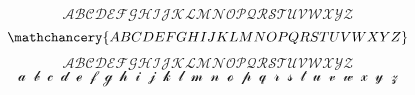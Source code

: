 \documentclass{article}
\begin{document}
$$\mathcal{ABCDEFGHIJKLMNOPQRSTUVWXYZ}$$
$$\mathchancery{ABCDEFGHIJKLMNOPQRSTUVWXYZ}$$
$$\mathscr{ABCDEFGHIJKLMNOPQRSTUVWXYZ}$$
$$
\mscra\mscrb\mscrc\mscrd\mscre\mscrf\mscrg\mscrh\mscri\mscrj
\mscrk\mscrl\mscrm\mscrn\mscro\mscrp\mscrq\mscrr\mscrs\mscrt
\mscru\mscrv\mscrw\mscrx\mscry\mscrz
$$
\end{document}
